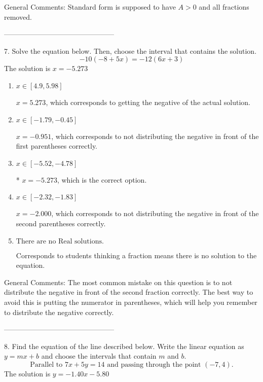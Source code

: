 \documentclass{extbook}[14pt]
\begin{document}
General Comments: Standard form is supposed to have $A > 0$ and all fractions removed.

-----------------------------------------------

7. Solve the equation below. Then, choose the interval that contains the solution.
\[ -10(-8+5 x) = -12(6 x+3) \] 
The solution is $ x = -5.273 $ 

\begin{enumerate}[label=\Alph*.] 
\item $ x \in [4.9, 5.98] $ 

  $x = 5.273$, which corresponds to getting the negative of the actual solution. 
\item $ x \in [-1.79, -0.45] $ 

  $x = -0.951$, which corresponds to not distributing the negative in front of the first parentheses correctly. 
\item $ x \in [-5.52, -4.78] $ 

 * $x = -5.273$, which is the correct option. 
\item $ x \in [-2.32, -1.83] $ 

  $x = -2.000$, which corresponds to not distributing the negative in front of the second parentheses correctly. 
\item $ \text{There are no Real solutions. } $ 

 Corresponds to students thinking a fraction means there is no solution to the equation. 
\end{enumerate} 
 
General Comments: The most common mistake on this question is to not distribute the negative in front of the second fraction correctly. The best way to avoid this is putting the numerator in parentheses, which will help you remember to distribute the negative correctly.

-----------------------------------------------

8. Find the equation of the line described below. Write the linear equation as $ y=mx+b $ and choose the intervals that contain $m$ and $b$.
\[ \text{Parallel to } 7 x + 5 y = 14 \text{ and passing through the point } (-7, 4). \] 
The solution is $ y = -1.40x - 5.80 $ 
\end{document}
